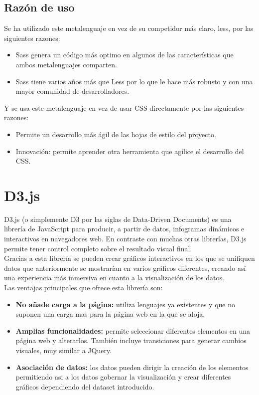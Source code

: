 
\subsection{Razón de uso}
Se ha utilizado este metalenguaje en vez de su competidor más claro, less, por las siguientes razones:

\begin{itemize}
	\item Sass genera un código más optimo en algunos de las características que ambos metalenguajes comparten.
	\item Sass tiene varios años más que Less por lo que le hace más robusto y con una mayor comunidad de desarrolladores.
\end{itemize}

Y se usa este metalenguaje en vez de usar CSS directamente por las siguientes razones:

\begin{itemize}
	\item Permite un desarrollo más ágil de las hojas de estilo del proyecto.
	\item Innovación: permite aprender otra herramienta que agilice el desarrollo del CSS.
\end{itemize}

\section{D3.js}
D3.js (o simplemente D3 por las siglas de Data-Driven Documents) es una librería de JavaScript para producir, a partir de datos, infogramas dinámicos e interactivos en navegadores web. En contraste con muchas otras librerías, D3.js permite tener control completo sobre el resultado visual final.\\

Gracias a esta librería se pueden crear gráficos interactivos en los que se unifiquen datos que anteriormente se mostrarían en varios gráficos diferentes, creando así una experiencia más inmersiva en cuanto a la visualización de los datos. \\

Las ventajas principales que ofrece esta librería son:
\begin{itemize}
	\item \textbf{No añade carga a la página:} utiliza lenguajes ya existentes y que no suponen una carga mas para la página web en la que se aloja.
	\item \textbf{Amplias funcionalidades:} permite seleccionar diferentes elementos en una página web y alterarlos. También incluye transiciones para generar cambios visuales, muy similar a JQuery.
	\item \textbf{Asociación de datos:} los datos pueden dirigir la creación de los elementos permitiendo asi a los datos gobernar la visualización y crear diferentes gráficos dependiendo del dataset introducido.
\end{itemize}

